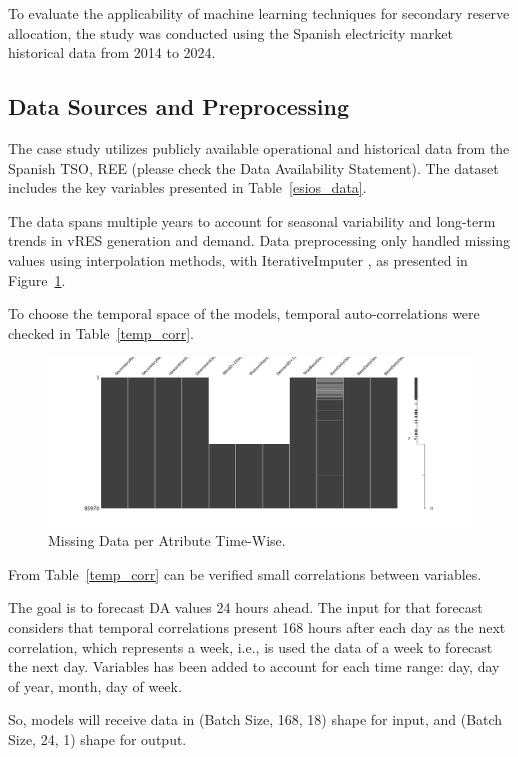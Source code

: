 To evaluate the applicability of machine learning techniques for secondary reserve allocation, the study was conducted using the Spanish electricity market historical data from 2014 to 2024.

\subsection{Data Sources and Preprocessing}

The case study utilizes publicly available operational and historical data from the Spanish \gls{TSO}, \gls{REE} (please check the Data Availability Statement). The dataset includes the key variables presented in Table~\ref{esios_data}.

The data spans multiple years to account for seasonal variability and long-term trends in vRES generation and demand. Data preprocessing only handled missing values using interpolation methods, with IterativeImputer \cite{vanBuuren2011,Buck1960}, as presented in Figure~\ref{fig:misisng_data}.

To choose the temporal space of the models, temporal auto-correlations were checked in Table~\ref{temp_corr}.

\begin{figure}[H]
    \centering
    \includegraphics[width=\textwidth]{plots/missing_data.png}
    \caption{Missing Data per Atribute Time-Wise.}
    \label{fig:misisng_data}
  \end{figure}





From Table~\ref{temp_corr} can be verified small correlations between variables. 

The goal is to forecast \gls{DA} values 24 hours ahead. The input for that forecast considers that temporal correlations present 168 hours after each day as the next correlation, which represents a week, i.e., is used the data of a week to forecast the next day.
Variables has been added to account for each time range: day, day of year, month, day of week.\par
So, models will receive data in (Batch Size, 168, 18) shape for input, and (Batch Size, 24, 1) shape for output.

